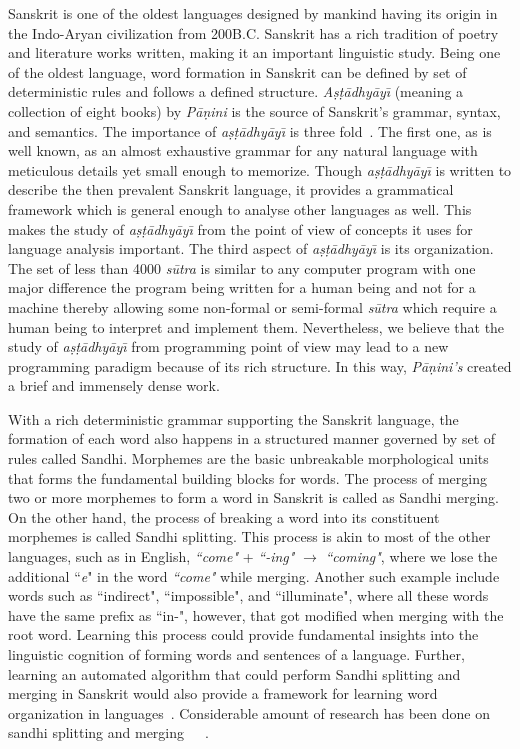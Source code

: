\documentclass[11pt]{article}
\begin{document}
Sanskrit is one of the oldest languages designed by mankind having its origin in the Indo-Aryan civilization from 200B.C. Sanskrit has a rich tradition of poetry and literature works written, making it an important linguistic study. Being one of the oldest language, word formation in Sanskrit can be defined by set of deterministic rules and follows a defined structure. \textit{A\d{s}\d{t}\={a}dhy\={a}y\={\i}} (meaning a collection of eight books) by \textit{P\={a}\d{n}ini} is the source of Sanskrit's grammar, syntax, and semantics. The importance of \textit{a\d{s}\d{t}\={a}dhy\={a}y\={\i}} is three fold~\cite{bharati2007}. The first one, as is well known, as an almost exhaustive grammar for any natural language with meticulous details yet small enough to memorize. Though \textit{a\d{s}\d{t}\={a}dhy\={a}y\={\i}} is written to describe the then prevalent Sanskrit language, it provides a grammatical framework which is general enough to analyse other languages as well. This makes the study of \textit{a\d{s}\d{t}\={a}dhy\={a}y\={\i}} from the point of view of concepts it uses for language analysis important. The third aspect of \textit{a\d{s}\d{t}\={a}dhy\={a}y\={\i}} is its organization. The set of less than 4000 \textit{s\={u}tra} is similar to any computer program with one major difference the program being written for a human being and not for a machine thereby allowing some non-formal or semi-formal \textit{s\={u}tra} which require a human being to interpret and implement them. Nevertheless, we believe that the study of \textit{a\d{s}\d{t}\={a}dhy\={a}y\={\i}} from programming point of view may lead to a new programming paradigm because of its rich structure. In this way, 	\textit{P\={a}\d{n}ini's} created a brief and immensely dense work. 



With a rich deterministic grammar supporting the Sanskrit language, the formation of each word also happens in a structured manner governed by set of rules called Sandhi. Morphemes are the basic unbreakable morphological units that forms the fundamental building blocks for words. The process of merging two or more morphemes to form a word in Sanskrit is called as Sandhi merging. On the other hand, the process of breaking a word into its constituent morphemes is called Sandhi splitting. This process is akin to most of the other languages, such as in English, \textit{``come"} + \textit{``-ing"} $\rightarrow$ \textit{``coming"}, where we lose the additional ``\textit{e}" in the word \textit{``come"} while merging. Another such example include words such as ``indirect", ``impossible", and ``illuminate", where all these words have the same prefix as ``in-", however, that got modified when merging with the root word. Learning this process could provide fundamental insights into the linguistic cognition of forming words and sentences of a language. Further, learning an automated algorithm that could perform Sandhi splitting and merging in Sanskrit would also provide a framework for learning word organization in languages~\cite{bharati2006building}. Considerable amount of research has been done on sandhi splitting and merging~\cite{Gillon2009}~\cite{kulkarni2009sanskrit}~\cite{kumar2010a}.
\end{document}
